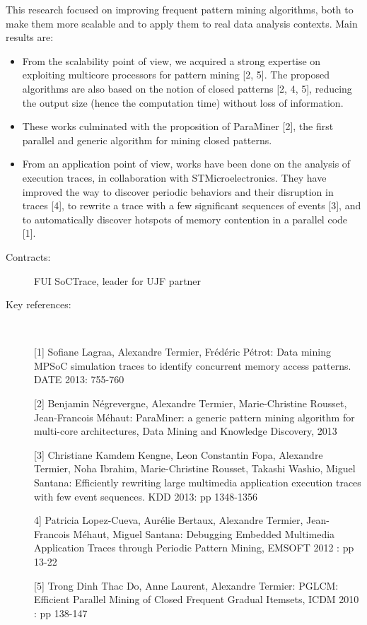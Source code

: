 This research focused on improving frequent pattern mining algorithms, both to make them more scalable and to apply them to real data analysis contexts. Main results are:

\begin{itemize}
\item  From the scalability point of view, we acquired a strong expertise on exploiting multicore processors for pattern mining [2, 5].
The proposed algorithms are also based on the notion of closed patterns [2, 4, 5], reducing the output size (hence the computation time) without loss of information.

\item These works culminated with the proposition of ParaMiner [2], the first parallel and generic algorithm for mining closed patterns.

\item From an application point of view, works have been done on the analysis of execution traces, in collaboration with STMicroelectronics.
They have improved the way to discover periodic behaviors and their disruption in traces [4], to rewrite a trace with a few significant sequences of events [3], and to automatically discover hotspots of memory contention in a parallel code [1].
\end{itemize}

\begin{description}

\item[Contracts:] FUI SoCTrace, leader for UJF partner
  
\item[Key references:]~%

[1] Sofiane Lagraa, Alexandre Termier, Fr{\'e}d{\'e}ric P{\'e}trot: Data mining MPSoC simulation traces to identify concurrent memory access patterns. DATE 2013: 755-760

[2] Benjamin N{\'e}grevergne, Alexandre Termier, Marie-Christine Rousset, Jean-Francois M{\'e}haut: ParaMiner: a generic pattern mining algorithm for multi-core architectures, Data Mining and Knowledge Discovery, 2013

[3] Christiane Kamdem Kengne, Leon Constantin Fopa, Alexandre Termier, Noha Ibrahim, Marie-Christine Rousset, Takashi Washio, Miguel Santana: Efficiently rewriting large multimedia application execution traces with few event sequences. KDD 2013: pp 1348-1356

4] Patricia Lopez-Cueva, Aur{\'e}lie Bertaux, Alexandre Termier, Jean-Francois M{\'e}haut, Miguel Santana: Debugging Embedded Multimedia Application Traces through Periodic Pattern Mining, EMSOFT 2012 : pp 13-22

[5] Trong Dinh Thac Do, Anne Laurent, Alexandre Termier: PGLCM: Efficient Parallel Mining of Closed Frequent Gradual Itemsets, ICDM 2010 : pp 138-147

\end{description}

